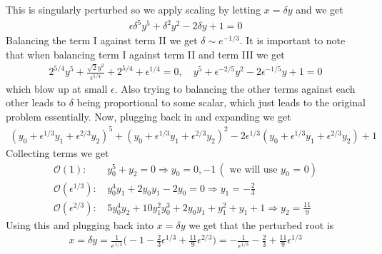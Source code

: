 \documentclass[12pt]{article}
\theoremstyle{remark}
\begin{document}
This is singularly perturbed so we apply scaling by letting $x = \delta y$ and we get 
\begin{align*}
	\epsilon \delta^5 y^5 + \delta^2y^2 - 2\delta y + 1 = 0
\end{align*}
Balancing the term I against term II we get $\delta \sim e^{-1/3}$. It is important to note that when balancing term I against term II and term III we get
\begin{align*}
	2^{5/4} y^5 + \frac{\sqrt{2}y^2}{\epsilon^{1/4}} + 2^{5/4} + \epsilon^{1/4} = 0, \quad y^5 + \epsilon^{-2/5}y^2 - 2\epsilon^{-1/5}y + 1 = 0
\end{align*}  
which blow up at small $\epsilon$. Also trying to balancing the other terms against each other leads to $\delta$ being proportional to some scalar, which just leads to the original problem essentially. Now, plugging back in and expanding we get 
\begin{align*}
	(y_0 + \epsilon^{1/3}y_1 + \epsilon^{2/3} y_2)^5 + (y_0 + \epsilon^{1/3}y_1 + \epsilon^{2/3} y_2)^2 - 2\epsilon^{1/3}(y_0 + \epsilon^{1/3}y_1 + \epsilon^{2/3} y_2) + 1
\end{align*}
Collecting terms we get
\begin{align*}
	\mathcal{O}(1): & \, y_0^5 + y_2 = 0 \Rightarrow y_0 = 0,-1 \, (\text{ we will use $y_0$ = 0}) \\
	\mathcal{O}(\epsilon^{1/3}): & \, y_0^4y_1 + 2y_0y_1 - 2y_0 = 0 \Rightarrow y_1 = -\frac{2}{3} \\
	\mathcal{O}(\epsilon^{2/3}): & \, 5y_0^4y_2 + 10y_1^2y_0^3 + 2y_0y_1 + y_1^2 + y_1 + 1 \Rightarrow y_2 = \frac{11}{9} 
\end{align*}
Using this and plugging back into $x = \delta y$ we get that the perturbed root is 
\begin{align*}
	x = \delta y = \frac{1}{e^{1/3}}\bigg(-1 -\frac{2}{3}\epsilon^{1/3} + \frac{11}{9}\epsilon^{2/3} \bigg) = -\frac{1}{\epsilon^{1/3}} - \frac{2}{3} + \frac{11}{9}\epsilon^{1/3}
\end{align*}
\end{document}
